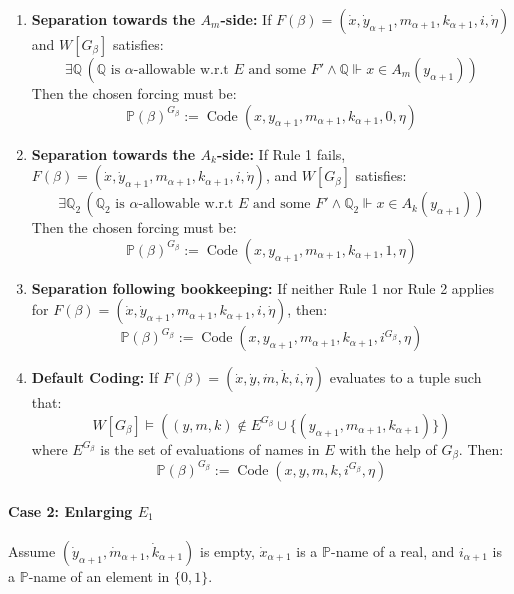 \documentclass[a4paper,11pt]{article}
\begin{document}
\begin{enumerate}
    \item \textbf{Separation towards the $A_m$-side:} If $F(\beta) = (\dot{x}, \dot{y}_{\alpha+1}, m_{\alpha+1}, k_{\alpha+1}, i, \dot{\eta})$ and $W[G_{\beta}]$ satisfies:
    $$ \exists \mathbb{Q} \, (\mathbb{Q} \text{ is } \alpha \text{-allowable w.r.t } E \text{ and some } F' \land \mathbb{Q} \Vdash x \in A_m(y_{\alpha+1})) $$
    Then the chosen forcing must be:
    $$ \mathbb{P}(\beta)^{G_{\beta}} := \operatorname{Code}(x, y_{\alpha+1}, m_{\alpha+1}, k_{\alpha+1}, 0, \eta) $$

    \item \textbf{Separation towards the $A_k$-side:} If Rule 1 fails, $F(\beta) = (\dot{x}, \dot{y}_{\alpha+1}, m_{\alpha+1}, k_{\alpha+1}, i, \dot{\eta})$, and $W[G_{\beta}]$ satisfies:
    $$ \exists \mathbb{Q}_2 \, (\mathbb{Q}_2 \text{ is } \alpha\text{-allowable w.r.t } E \text{ and some } F' \land \mathbb{Q}_2 \Vdash x \in A_k(y_{\alpha+1})) $$
    Then the chosen forcing must be:
    $$ \mathbb{P}(\beta)^{G_{\beta}} := \operatorname{Code}(x, y_{\alpha+1}, m_{\alpha+1}, k_{\alpha+1}, 1, \eta) $$

    \item \textbf{Separation following bookkeeping:} If neither Rule 1 nor Rule 2 applies for $F(\beta) = (\dot{x}, \dot{y}_{\alpha+1}, m_{\alpha+1}, k_{\alpha+1}, i, \dot{\eta})$, then:
    $$ \mathbb{P}(\beta)^{G_{\beta}} := \operatorname{Code}(x, y_{\alpha+1}, m_{\alpha+1}, k_{\alpha+1}, i^{G_{\beta}}, \eta) $$

    \item \textbf{Default Coding:} If $F(\beta) = (\dot{x}, \dot{y}, \dot{m}, \dot{k}, i, \dot{\eta})$ evaluates to a tuple such that:
    $$ W[G_{\beta}] \models ((y, m, k) \notin E^{G_{\beta}} \cup \{(y_{\alpha+1}, m_{\alpha+1}, k_{\alpha+1})\}) $$
    where $E^{G_{\beta}}$ is the set of evaluations of names in $E$ with the help of $G_{\beta}$. Then:
    $$ \mathbb{P}(\beta)^{G_{\beta}} := \operatorname{Code}(x, y, m, k, i^{G_{\beta}}, \eta) $$
\end{enumerate}

\paragraph{Case 2: Enlarging $E_1$}
Assume $(\dot{y}_{\alpha+1}, \dot{m}_{\alpha+1}, \dot{k}_{\alpha+1})$ is empty, $\dot{x}_{\alpha+1}$ is a $\mathbb{P}$-name of a real, and $i_{\alpha+1}$ is a $\mathbb{P}$-name of an element in $\{0,1\}$. 
\end{document}
